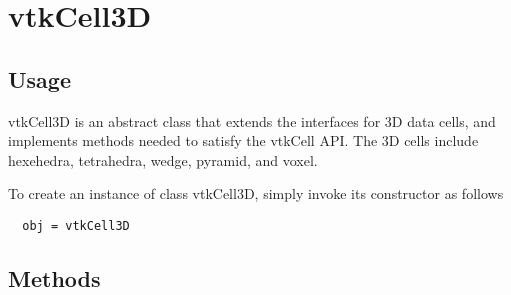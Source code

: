 \section{vtkCell3D}

\subsection{Usage}

 vtkCell3D is an abstract class that extends the interfaces for 3D data 
 cells, and implements methods needed to satisfy the vtkCell API. The 
 3D cells include hexehedra, tetrahedra, wedge, pyramid, and voxel.

To create an instance of class vtkCell3D, simply
invoke its constructor as follows
\begin{verbatim}
  obj = vtkCell3D
\end{verbatim}
\subsection{Methods}

